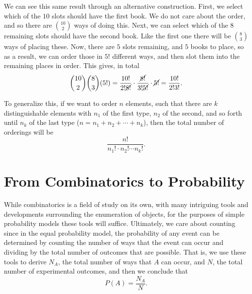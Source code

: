 \documentclass[
  letterpaper,
  DIV=11,
  numbers=noendperiod]{scrreprt}
\theoremstyle{definition}
\theoremstyle{definition}
\theoremstyle{definition}
\theoremstyle{remark}
\begin{document}
We can see this same result through an alternative construction. First,
we select which of the \(10\) slots should have the first book. We do
not care about the order, and so there are \(\binom{10}{2}\) ways of
doing this. Next, we can select which of the \(8\) remaining slots
should have the second book. Like the first one there will be
\(\binom{8}{3}\) ways of placing these. Now, there are \(5\) slots
remaining, and \(5\) books to place, so as a result, we can order those
in \(5!\) different ways, and then slot them into the remaining places
in order. This gives, in total
\[\binom{10}{2}\binom{8}{3}(5!) = \frac{10!}{2!\cancel{8!}}\cdot\frac{\cancel{8!}}{3!\cancel{5!}}\cdot\cancel{5!} = \frac{10!}{2!3!}.\]

To generalize this, if we want to order \(n\) elements, such that there
are \(k\) distinguishable elements with \(n_1\) of the first type,
\(n_2\) of the second, and so forth until \(n_k\) of the last type
(\(n = n_1 + n_2 + \cdots + n_k\)), then the total number of orderings
will be \[\frac{n!}{n_1!\cdot n_2!\cdots n_k!}.\]

\section{From Combinatorics to
Probability}\label{from-combinatorics-to-probability}

While combinatorics is a field of study on its own, with many intriguing
tools and developments surrounding the enumeration of objects, for the
purposes of simple probability models these tools will suffice.
Ultimately, we care about counting since in the equal probability model,
the probability of any event can be determined by counting the number of
ways that the event can occur and dividing by the total number of
outcomes that are possible. That is, we use these tools to derive
\(N_A\), the total number of ways that \(A\) can occur, and \(N\), the
total number of experimental outcomes, and then we conclude that
\[P(A) = \frac{N_A}{N}.\]
\end{document}
